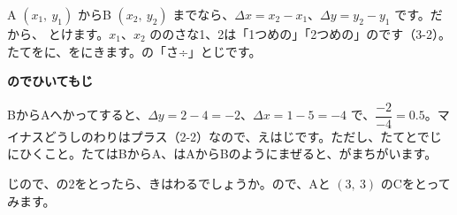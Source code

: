 \par\vspace{4pt}
A $(x_1,\ y_1)$ からB $(x_2,\ y_2)$ までなら、$\Delta x=x_2-x_1$、$\Delta y=y_2-y_1$ です。だから、
とけます。$x_1$、$x_2$ ののさな1、2は「1つめの」「2つめの」のです（3-2）。たてをに、をにきます。の「さ÷」とじです。

\begin{seikaku}
\textbf{のでひいてもじ}\par
BからAへかってすると、$\Delta y=2-4=-2$、$\Delta x=1-5=-4$ で、$\dfrac{-2}{-4}=0.5$。マイナスどうしのわりはプラス（2-2）なので、えはじです。ただし、たてとでじにひくこと。たてはBからA、はAからBのようにまぜると、がまちがいます。
\end{seikaku}

じので、の2をとったら、きはわるでしょうか。ので、Aと $(3,\ 3)$ のCをとってみます。

